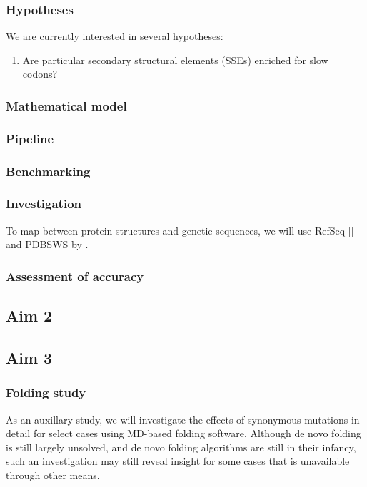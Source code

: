 \documentclass[11pt]{nih}
\begin{document}
\subsubsection{Hypotheses}
We are currently interested in several hypotheses:
\begin{enumerate}
\item Are particular secondary structural elements (SSEs) enriched for slow codons?
\end{enumerate}

\subsubsection{Mathematical model}

\subsubsection{Pipeline}

\subsubsection{Benchmarking}

\subsubsection{Investigation}

To map between protein structures and genetic sequences, we will use RefSeq [] and PDBSWS by \cite{Martin2005}.

\subsubsection{Assessment of accuracy}

\subsection{Aim 2}

\subsection{Aim 3}

\subsubsection{Folding study}
As an auxillary study, we will investigate the effects of synonymous mutations in detail for select cases using MD-based folding software. Although de novo folding is still largely unsolved, and de novo folding algorithms are still in their infancy, such an investigation may still reveal insight for some cases that is unavailable through other means. \cite{Zhang:2008p3335}  




 

\appendix
\end{document}

